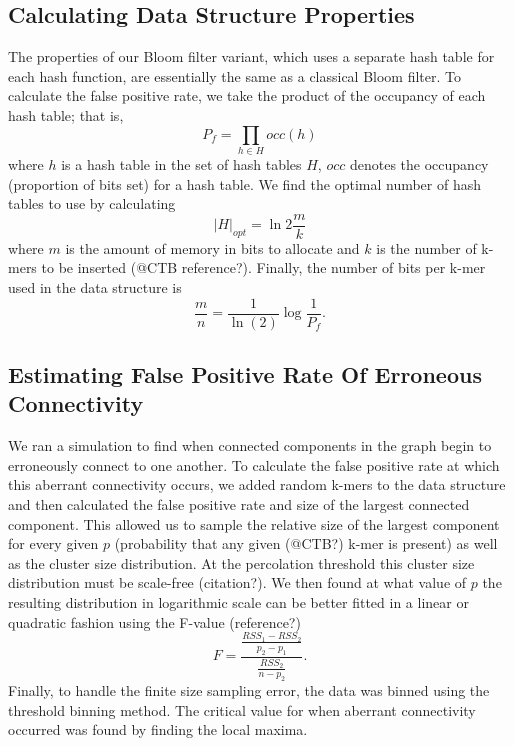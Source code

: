 \documentclass[12pt]{article} \usepackage{simplemargins}
\begin{document}
\subsection{Calculating Data Structure Properties}
The properties of our Bloom filter variant, which 
uses a separate hash table for each hash function, are essentially the 
same as a classical Bloom filter. To calculate the false positive rate, we 
take the product of the occupancy of each hash table; that is,
\begin{displaymath}
P_f = \prod_{h \in H} occ(h)
\end{displaymath}
where $h$ is a hash table in the set of hash tables $H$, $occ$ denotes 
the occupancy (proportion of bits set) for a hash table.
We find the optimal number of hash tables 
to use by calculating
\begin{displaymath}
\vert H \vert_{opt} = \ln 2 \frac{m}{k}
\end{displaymath}
where $m$ is the amount of memory in bits to allocate and $k$ 
is the number of k-mers to be inserted (@CTB reference?). Finally, 
the number of bits per 
k-mer used in the data structure is 
\begin{displaymath}
\frac{m}{n} = \frac{1}{\ln(2)} \log{\frac{1}{P_f}}.
\end{displaymath}

\subsection{Estimating False Positive Rate Of Erroneous Connectivity}
We ran a simulation to find when connected components in the graph 
begin to erroneously connect to one another.
To calculate the false positive rate at which this aberrant 
connectivity occurs, 
we added random k-mers to the data structure 
and then calculated the false positive rate and size of 
the largest connected 
component. This allowed us to sample the relative size of 
the largest component for every 
given $p$ (probability that any given (@CTB?) k-mer is present) as well as the cluster size distribution. 
At the percolation threshold this cluster size distribution must be scale-free (citation?). 
We then found at what value of $p$ the resulting 
distribution in logarithmic 
scale can be better fitted in a linear or quadratic fashion using 
the F-value (reference?)
\newline
\newline
\begin{displaymath}
F=\frac{\frac{RSS_1-RSS_2}{p_2-p_1}}{\frac{RSS_2}{n-p_2}}.
\end{displaymath}
Finally, to handle the finite size sampling error, the data was binned using the 
threshold binning method\cite{adami2002critical}. The critical value for 
when aberrant connectivity occurred was found by finding the local maxima.
\end{document}

